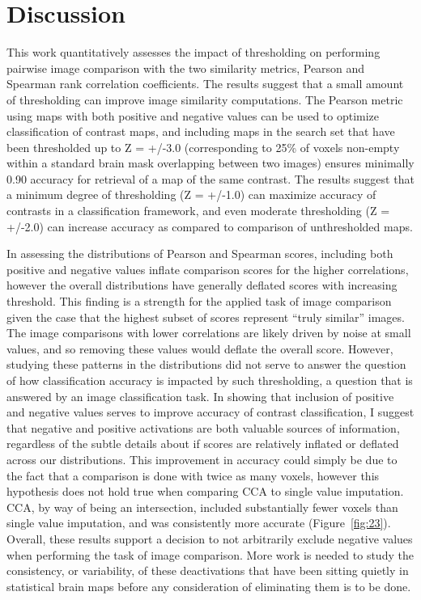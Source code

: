 \documentclass{report}
\begin{document}
\section{Discussion}

This work quantitatively assesses the impact of thresholding on
performing pairwise image comparison with the two similarity metrics,
Pearson and Spearman rank correlation coefficients. The results suggest
that a small amount of thresholding can improve image similarity
computations. The Pearson metric using maps with both positive and
negative values can be used to optimize classification of contrast maps,
and including maps in the search set that have been thresholded up to Z
= +/-3.0 (corresponding to 25\% of voxels non-empty within a standard
brain mask overlapping between two images) ensures minimally 0.90
accuracy for retrieval of a map of the same contrast. The results
suggest that a minimum degree of thresholding (Z = +/-1.0) can maximize
accuracy of contrasts in a classification framework, and even moderate
thresholding (Z = +/-2.0) can increase accuracy as compared to comparison
of unthresholded maps.

In assessing the distributions of Pearson and Spearman scores, including
both positive and negative values inflate comparison scores for the
higher correlations, however the overall distributions have generally
deflated scores with increasing threshold. This finding is a strength
for the applied task of image comparison given the case that the highest
subset of scores represent ``truly similar'' images. The image
comparisons with lower correlations are likely driven by noise at small
values, and so removing these values would deflate the overall score.
However, studying these patterns in the distributions did not serve to
answer the question of how classification accuracy is impacted by such
thresholding, a question that is answered by an image classification
task. In showing that inclusion of positive and negative values serves
to improve accuracy of contrast classification, I suggest that negative
and positive activations are both valuable sources of information,
regardless of the subtle details about if scores are relatively inflated
or deflated across our distributions. This improvement in accuracy could
simply be due to the fact that a comparison is done with twice as many
voxels, however this hypothesis does not hold true when comparing CCA to
single value imputation. CCA, by way of being an intersection, included
substantially fewer voxels than single value imputation, and was
consistently more accurate (Figure~\ref{fig:23}). Overall, these results support a
decision to not arbitrarily exclude negative values when performing the
task of image comparison. More work is needed to study the consistency,
or variability, of these deactivations that have been sitting quietly in
statistical brain maps before any consideration of eliminating them is
to be done.
\end{document}
